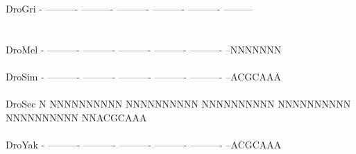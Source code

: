 \documentclass[11pt,twoside,reqno,a4paper]{article}
\begin{document}
{DroGri	-	----------	----------	----------	----------	----------	---------\\
\hspace*{7\charwidth}\hspace*{1\charwidth}\hspace*{1\charwidth}\hspace*{1\charwidth}\hspace*{1\charwidth}\hspace*{1\charwidth}\hspace*{1\charwidth}\\
\\
DroMel	-	----------	----------	----------	----------	----------	--NNNNNNN\\
\hspace*{7\charwidth}\hspace*{1\charwidth}\hspace*{1\charwidth}\hspace*{1\charwidth}\hspace*{1\charwidth}\hspace*{1\charwidth}\hspace*{1\charwidth}\\
DroSim	-	----------	----------	----------	----------	----------	--ACGCAAA\\
\hspace*{7\charwidth}\hspace*{1\charwidth}\hspace*{1\charwidth}\hspace*{1\charwidth}\hspace*{1\charwidth}\hspace*{1\charwidth}\hspace*{1\charwidth}\\
DroSec	N	NNNNNNNNNN	NNNNNNNNNN	NNNNNNNNNN	NNNNNNNNNN	NNNNNNNNNN	NNACGCAAA\\
\hspace*{7\charwidth}\hspace*{1\charwidth}\hspace*{1\charwidth}\hspace*{1\charwidth}\hspace*{1\charwidth}\hspace*{1\charwidth}\hspace*{1\charwidth}\\
DroYak	-	----------	----------	----------	----------	----------	--ACGCAAA\\
\hspace*{7\charwidth}\hspace*{1\charwidth}\hspace*{1\charwidth}\hspace*{1\charwidth}\hspace*{1\charwidth}\hspace*{1\charwidth}\hspace*{1\charwidth}\\
}
\end{document}
